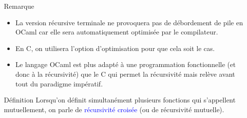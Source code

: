 \documentclass[10pt]{beamer}
\begin{document}
\begin{frame}{\Ctitle}{\stitle}
	\begin{block}{Remarque}
		\begin{itemize}
			\item<1-> La version récursive terminale ne provoquera pas de débordement de pile en OCaml car elle sera automatiquement optimisée par le compilateur.
			\item<2-> En C, on utilisera l'option d'optimisation  pour que cela soit le cas.
			\item<3-> Le langage OCaml est plus \og{}adapté\fg{} à une programmation fonctionnelle (et donc à la récursivité) que le C qui permet la récursivité mais relève avant tout du paradigme impératif.
		\end{itemize}
	\end{block}
\end{frame}

\begin{frame}{\Ctitle}{\stitle}
	\begin{alertblock}{Définition}
		Lorsqu'on définit simultanément plusieurs fonctions qui s'appellent mutuellement, on parle de \textcolor{blue}{récursivité croisée} (ou de récursivité mutuelle).
	\end{alertblock}
\end{frame}
\end{document}
